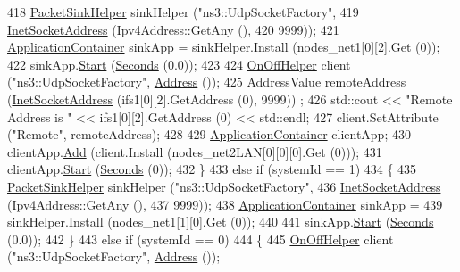 \begin{DoxyCode}
418           \hyperlink{classns3_1_1PacketSinkHelper}{PacketSinkHelper} sinkHelper (\textcolor{stringliteral}{"ns3::UdpSocketFactory"},
419                                        \hyperlink{classns3_1_1InetSocketAddress}{InetSocketAddress} (Ipv4Address::GetAny (),
420                                                           9999));
421           \hyperlink{classns3_1_1ApplicationContainer}{ApplicationContainer} sinkApp = sinkHelper.Install (nodes\_net1[0][2].Get (0));
422           sinkApp.\hyperlink{classns3_1_1ApplicationContainer_a8eff87926507020bbe3e1390358a54a7}{Start} (\hyperlink{group__timecivil_ga33c34b816f8ff6628e33d5c8e9713b9e}{Seconds} (0.0));
423 
424           \hyperlink{classns3_1_1OnOffHelper}{OnOffHelper} client (\textcolor{stringliteral}{"ns3::UdpSocketFactory"}, \hyperlink{classns3_1_1Address}{Address} ());
425           AddressValue remoteAddress (\hyperlink{classns3_1_1InetSocketAddress}{InetSocketAddress} (ifs1[0][2].GetAddress (0), 9999))
      ;
426           std::cout << \textcolor{stringliteral}{"Remote Address is "} << ifs1[0][2].GetAddress (0) << std::endl;
427           client.SetAttribute (\textcolor{stringliteral}{"Remote"}, remoteAddress);
428 
429           \hyperlink{classns3_1_1ApplicationContainer}{ApplicationContainer} clientApp;
430           clientApp.\hyperlink{classns3_1_1ApplicationContainer_ad09ab1a1ad5849d518d5f4c262e38152}{Add} (client.Install (nodes\_net2LAN[0][0][0].Get (0)));
431           clientApp.\hyperlink{classns3_1_1ApplicationContainer_a8eff87926507020bbe3e1390358a54a7}{Start} (\hyperlink{group__timecivil_ga33c34b816f8ff6628e33d5c8e9713b9e}{Seconds} (0));
432         \}
433       \textcolor{keywordflow}{else} \textcolor{keywordflow}{if} (systemId == 1)
434         \{
435           \hyperlink{classns3_1_1PacketSinkHelper}{PacketSinkHelper} sinkHelper (\textcolor{stringliteral}{"ns3::UdpSocketFactory"},
436                                        \hyperlink{classns3_1_1InetSocketAddress}{InetSocketAddress} (Ipv4Address::GetAny (),
437                                                           9999));
438           \hyperlink{classns3_1_1ApplicationContainer}{ApplicationContainer} sinkApp =
439             sinkHelper.Install (nodes\_net1[1][0].Get (0));
440 
441           sinkApp.\hyperlink{classns3_1_1ApplicationContainer_a8eff87926507020bbe3e1390358a54a7}{Start} (\hyperlink{group__timecivil_ga33c34b816f8ff6628e33d5c8e9713b9e}{Seconds} (0.0));
442         \}
443       \textcolor{keywordflow}{else} \textcolor{keywordflow}{if} (systemId == 0)
444         \{
445           \hyperlink{classns3_1_1OnOffHelper}{OnOffHelper} client (\textcolor{stringliteral}{"ns3::UdpSocketFactory"}, \hyperlink{classns3_1_1Address}{Address} ());

\end{DoxyCode}

